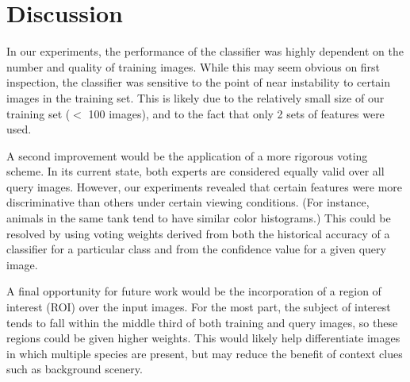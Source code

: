 \documentclass[10pt,twocolumn,letterpaper]{article}
\begin{document}
\section{Discussion}
	In our experiments, the performance of the classifier was highly dependent on the number and quality of training images. While this may seem obvious on first inspection, the classifier was sensitive to the point of near instability to certain images in the training set. This is likely due to the relatively small size of our training set ($<$ 100 images), and to the fact that only 2 sets of features were used.
	
	A second improvement would be the application of a more rigorous voting scheme. In its current state, both experts are considered equally valid over all query images. However, our experiments revealed that certain features were more discriminative than others under certain viewing conditions. (For instance, animals in the same tank tend to have similar color histograms.) This could be resolved by using voting weights derived from both the historical accuracy of a classifier for a particular class and from the confidence value for a given query image.
	
	A final opportunity for future work would be the incorporation of a region of interest (ROI) over the input images. For the most part, the subject of interest tends to fall within the middle third of both training and query images, so these regions could be given higher weights. This would likely help differentiate images in which multiple species are present, but may reduce the benefit of context clues such as background scenery.
\end{document}
